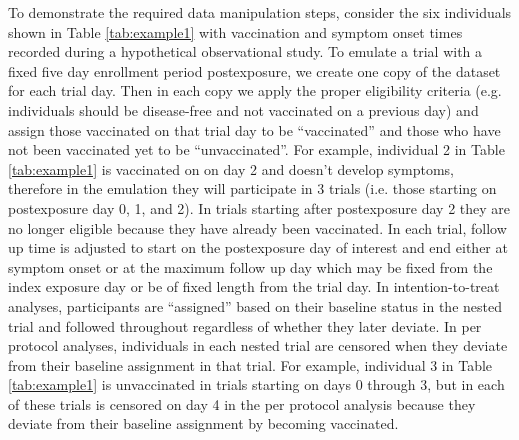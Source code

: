 \begin{appendices}
\begin{refsection}
    To demonstrate the required data manipulation steps, consider the six individuals shown in Table \ref{tab:example1} with vaccination and symptom onset times recorded during a hypothetical observational study. To emulate a trial with a fixed five day enrollment period postexposure, we create one copy of the dataset for each trial day. Then in each copy we apply the proper eligibility criteria (e.g. individuals should be disease-free and not vaccinated on a previous day) and assign those vaccinated on that trial day to be ``vaccinated'' and those who have not been vaccinated yet to be ``unvaccinated''. For example, individual 2 in Table \ref{tab:example1} is vaccinated on on day 2 and doesn't develop symptoms, therefore in the emulation they will participate in 3 trials (i.e. those starting on postexposure day 0, 1, and 2). In trials starting after postexposure day 2 they are no longer eligible because they have already been vaccinated. In each trial, follow up time is adjusted to start on the postexposure day of interest and end either at symptom onset or at the maximum follow up day which may be fixed from the index exposure day or be of fixed length from the trial day. In intention-to-treat analyses, participants are ``assigned'' based on their baseline status in the nested trial and followed throughout regardless of whether they later deviate. In per protocol analyses, individuals in each nested trial are censored when they deviate from their baseline assignment in that trial. For example, individual 3 in Table \ref{tab:example1} is unvaccinated in trials starting on days 0 through 3, but in each of these trials is censored on day 4 in the per protocol analysis because they deviate from their baseline assignment by becoming vaccinated.
    

\end{refsection}
\end{appendices}
